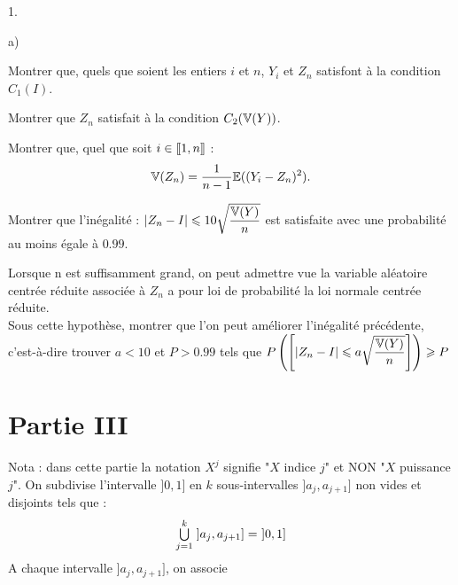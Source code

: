 \documentclass[11pt]{article}%
\begin{document}
\begin{noliste}{1.}
 \setlength{\itemsep}{4mm}
\item 

\begin{noliste}{a)}
 \setlength{\itemsep}{2mm}
\item Montrer que, quels que soient les entiers $i$ et $n$, $Y_{i}$ et
$Z_{n} $ satisfont à la condition $C_{1}(I)$.

\item Montrer que $Z_{n}$ satisfait à la condition $C_{2}(\mathbb{V}(Y))$.

\item Montrer que, quel que soit $i\in \lbrack
\hspace{-0.15em}[1,n]\hspace{-0.13em}]$ :
\[
\mathbb{V}(Z_{n}) = {\dfrac{1}{n-1}}\mathbb{E}((Y_{i}-Z_{n})^{2}).
\]
\end{noliste}

\item Montrer que l'inégalité : $\left| Z_{n}-I\right| \leqslant
10\sqrt{\dfrac{\mathbb{V}(Y)}{n}}$ est satisfaite avec une probabilité au moins
égale à 
$0.99$.

\item Lorsque n est suffisamment grand, on peut admettre vue la
variable aléatoire centrée réduite associée à $Z_{n}$ a pour loi de
probabilité la loi
normale centrée réduite. \\
Sous cette hypothèse, montrer que l'on peut améliorer l'inégalité
précédente, c'est-à-dire trouver $a<10$ et $P>0.99$ tels que
$P\left(\left[ { \left|
Z_{n}-I\right| \leqslant a\sqrt{\dfrac{\mathbb{V}(Y)}{n}}} \right]\right) \geqslant P$
\end{noliste}

\section*{Partie III}

Nota : dans cette partie la notation $X^{j}$ signifie "$X$ indice $j$"
et
NON "$X$ puissance $j$". On subdivise l'intervalle $]0,1]$ en $k$
sous-intervalles $]a_{j},a_{j + 1}]$ non vides et disjoints tels que : 
\[
{\textstyle\bigcup\limits_{j = 1}^{k}}\hspace{.1cm}]a_{j},a_{j + 1}] = \ ]0,1]
\]
A chaque intervalle $]a_{j},a_{j + 1}]$, on associe
\end{document}
